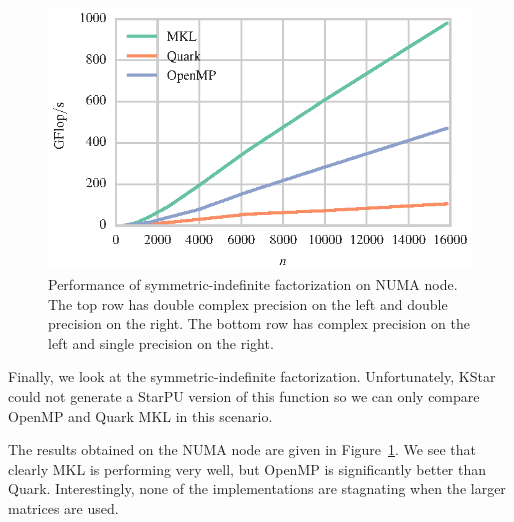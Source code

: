 \documentclass[a4paper,12pt]{article}
\begin{document}
\begin{figure}[t]
  \includegraphics[scale=.85]{fig/kebnekaise_ssytrf_weak_scaling.eps}
  \caption{Performance of symmetric-indefinite factorization on NUMA node.
    The top row has double complex precision on the left and double
    precision on the right.
    The bottom row has complex precision on the left and single
    precision on the right.}
  \label{fig.ldlt_numa}
\end{figure}

Finally,
we look at the symmetric-indefinite factorization.
Unfortunately, KStar could not generate a StarPU version of this
function so we can only compare OpenMP and Quark
MKL in this scenario.

The results obtained on the NUMA node are given in
Figure~\ref{fig.ldlt_numa}.
We see that clearly MKL is performing very well,
but OpenMP is significantly better than Quark.
Interestingly,
none of the implementations are stagnating when the larger matrices
are used.
\end{document}

